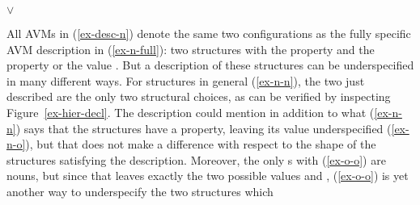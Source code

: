 \documentclass[output=paper,biblatex,babelshorthands,newtxmath,draftmode,colorlinks,citecolor=brown]{langscibook}
\begin{document}
\eal
\label{ex-desc-n}
\ex\label{ex-n-full} 
\ex\label{ex-n-n}
\ex\label{ex-n-o}
\ex\label{ex-o-o} 
\ex\label{ex-n-sfull} 
     $\lor$  
\zl

\noindent
All AVMs in (\ref{ex-desc-n}) denote the same two configurations as
the fully specific AVM description in (\ref{ex-n-full}): two
 structures with the  property  and
the  property  or the  value
. But a description of these structures can be
underspecified in many different ways. For  structures in
general (\ref{ex-n-n}), the two just described are the only two
structural choices, as can be verified by inspecting
Figure~\ref{ex-hier-decl}. The description could mention in addition
to what (\ref{ex-n-n}) says that
the structures have a  property, leaving its value
underspecified (\ref{ex-n-o}), but that does not make a difference
with respect to the shape of the structures satisfying the
description. Moreover, the only s with 
(\ref{ex-o-o}) are nouns, but since that leaves exactly the two possible
 values  and , (\ref{ex-o-o}) is
yet another way to underspecify the two structures which
\end{document}
